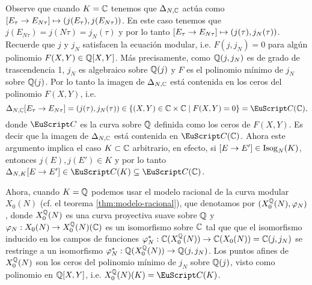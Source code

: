 \documentclass[../../tesis_maestria]{subfiles}
\begin{document}
Observe que cuando $K=\mathbb{C}$ tenemos que $\Delta_{N,\mathbb{C}}$ actúa como $[E_\tau\rightarrow E_{N\tau}]\mapsto (j(E_\tau),j(E_{N\tau}))$. En este caso tenemos que $j(E_{N\tau})=j(N\tau)=j_N(\tau)$ y por lo tanto $[E_\tau\rightarrow E_{N\tau}]\mapsto (j(\tau),j_N(\tau))$. Recuerde que $j$ y $j_N$ satisfacen la ecuación modular, i.e. $F(j,j_N)=0$ para algún polinomio $F(X,Y)\in\mathbb{Q}[X,Y]$. Más precisamente, como $\mathbb{Q}(j,j_N)$ es de grado de trascendencia 1, $j_N$ es algebraico sobre $\mathbb{Q}(j)$ y $F$ es el polinomio mínimo de $j_N$ sobre $\mathbb{Q}(j)$. Por lo tanto la imagen de $\Delta_{N,\mathbb{C}}$ está contenida en los ceros del polinomio $F(X,Y)$, i.e.
\[
	\Delta_{N,\CC}[E_\tau\ra E_{N\tau}]=(j(\tau),j_N(\tau))\in \{(X,Y)\in\CC\times\CC\mid F(X,Y)=0\}=\Cc(\CC),
\]
donde $\Cc$ es la curva sobre $\mathbb{Q}$ definida como los ceros de $F(X,Y)$. Es decir que la imagen de $\Delta_{N,\mathbb{C}}$ está contenida en $\Cc(\CC)$. Ahora este argumento implica el caso $K\subset\mathbb{C}$ arbitrario, en efecto, si $[E\rightarrow E']\in\mathrm{Isog}_N(K)$, entonces $j(E),j(E')\in K$ y por lo tanto $\Delta_{N,K}[E\ra E']\in\Cc(K)\subseteq\Cc(\CC)$.

Ahora, cuando $K=\mathbb{Q}$ podemos usar el modelo racional de la curva modular $X_0(N)$ (cf. el teorema \ref{thm:modelo-racional}), que denotamos por $(X^{\mathbb{Q}}_0(N),\varphi_N)$, donde $X^{\mathbb{Q}}_0(N)$ es una curva proyectiva suave sobre $\mathbb{Q}$ y $\varphi_N:X_0(N)\rightarrow X^{\mathbb{Q}}_0(N)(\mathbb{C})$ es un isomorfismo sobre $\mathbb{C}$ tal que que el isomorfismo inducido en los campos de funciones $\varphi_N^*:\mathbb{C}(X^{\mathbb{Q}}_0(N))\rightarrow\mathbb{C}(X_0(N))=\mathbb{C}(j,j_N)$ se restringe a un isomorfismo $\varphi_N^*:\mathbb{Q}(X^{\mathbb{Q}}_0(N))\rightarrow\mathbb{Q}(j,j_N)$. Los puntos afines de $X^{\mathbb{Q}}_0(N)$ son los ceros del polinomio mínimo de $j_N$ sobre $\mathbb{Q}(j)$, visto como polinomio en $\mathbb{Q}[X,Y]$, i.e. $X^\QQ_0(N)(K)=\Cc(K)$.
\end{document}
